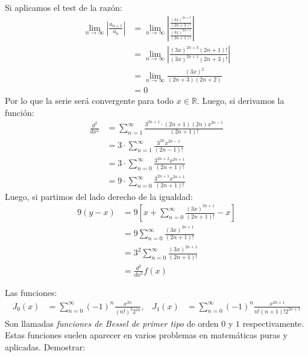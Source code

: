 \documentclass[../main.tex]{subfiles}
\begin{document}
Si aplicamos el test de la razón:
\begin{align*}
    \lim_{n \to \infty} \left|\frac{a_{n+1}}{a_n}\right| &= \lim_{n \to \infty} \left|\frac{\frac{(3x)^{2n+3}}{(2n+3)!}}{\frac{(3x)^{2n+1}}{(2n+1)!}}\right|\\
    &= \lim_{n \to \infty} \left|\frac{(3x)^{2n+3} (2n+1)!}{(3x)^{2n+1} (2n+3)!}\right|\\
    &= \lim_{n \to \infty} \frac{(3x)^2}{(2n+3)(2n+2)}\\
    &= 0
\end{align*}
Por lo que la serie será convergente para todo $x \in \mathbb{R}$. Luego, si derivamos la función:
\begin{align*}
    \frac{d^2}{dx^2} &= \sum_{n = 1}^\infty \frac{3^{2n+1} \cdot (2n+1)(2n) x^{2n-1}}{(2n+1)!}\\
    &= 3 \cdot \sum_{n = 1}^\infty \frac{3^{2n} x^{2n-1}}{(2n-1)!}\\
    &= 3 \cdot \sum_{n = 0}^\infty \frac{3^{2n+2} x^{2n+1}}{(2n+1)!}\\
    &= 9 \cdot \sum_{n = 0}^\infty \frac{3^{2n+1} x^{2n+1}}{(2n+1)!}
\end{align*}
Luego, si partimos del lado derecho de la igualdad:
\begin{align*}
    9(y-x) &= 9\left[x + \sum_{n = 0}^\infty \frac{(3x)^{2n+1}}{(2n+1)!} - x\right]\\
    &= 9 \sum_{n = 0}^\infty \frac{(3x)^{2n+1}}{(2n+1)!}\\
    &= 3^2 \sum_{n = 0}^\infty \frac{(3x)^{2n+1}}{(2n+1)!}\\
    &= \frac{d^2}{dx^2} f(x)
\end{align*}


Las funciones:
\begin{align*}
    J_0(x) &= \sum_{n = 0}^\infty (-1)^n \frac{x^{2n}}{(n!)^2 2^{2n}}, & J_1(x) &= \sum_{n = 0}^\infty (-1)^n \frac{x^{2n+1}}{n! (n+1)! 2^{2n+1}}
\end{align*}
Son llamadas \textit{funciones de Bessel de primer tipo} de orden $0$ y $1$ respectivamente. Estas funciones suelen aparecer en varios problemas en matemáticas puras y aplicadas. Demostrar:
\end{document}
